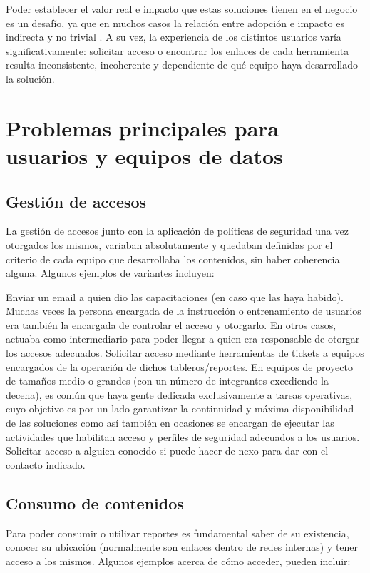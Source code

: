 Poder establecer el valor real e impacto que estas soluciones tienen en el negocio es un desafío, ya que en muchos casos la relación entre adopción e impacto es indirecta y no trivial \cite{davenport2006}. A su vez, la experiencia de los distintos usuarios varía significativamente: solicitar acceso o encontrar los enlaces de cada herramienta resulta inconsistente, incoherente y dependiente de qué equipo haya desarrollado la solución.

\section{Problemas principales para usuarios y equipos de datos}
\subsection{Gestión de accesos}

La gestión de accesos junto con la aplicación de políticas de seguridad una vez otorgados los mismos, variaban absolutamente y quedaban definidas por el criterio de cada equipo que desarrollaba los contenidos, sin haber coherencia alguna.
Algunos ejemplos de variantes incluyen:

Enviar un email a quien dio las capacitaciones (en caso que las haya habido). Muchas veces la persona encargada de la instrucción o entrenamiento de usuarios era también la encargada de controlar el acceso y otorgarlo. En otros casos, actuaba como intermediario para poder llegar a quien era responsable de otorgar los accesos adecuados.
Solicitar acceso mediante herramientas de tickets a equipos encargados de la operación de dichos tableros/reportes. En equipos de proyecto de tamaños medio o grandes (con un número de integrantes excediendo la decena), es común que haya gente dedicada exclusivamente a tareas operativas, cuyo objetivo es por un lado garantizar la continuidad y máxima disponibilidad de las soluciones como así también en ocasiones se encargan de ejecutar las actividades que habilitan acceso y perfiles de seguridad adecuados a los usuarios.
Solicitar acceso a alguien conocido si puede hacer de nexo para dar con el contacto indicado.

\subsection{Consumo de contenidos}

Para poder consumir o utilizar reportes es fundamental saber de su existencia, conocer su ubicación (normalmente son enlaces dentro de redes internas) y tener acceso a los mismos.
Algunos ejemplos acerca de cómo acceder, pueden incluir:

